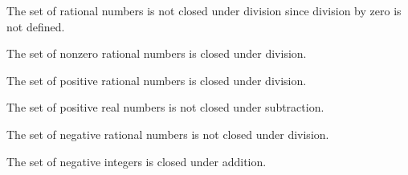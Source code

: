 \begin{list}{}
\item \begin{list}{\bf{(b)}}
\item The set of rational numbers is not closed under division since division by zero is not defined.
\end{list}
\end{list}

\begin{list}{}
\item \begin{list}{\bf{(c)}}
\item The set of nonzero rational numbers is closed under division.
\end{list}
\end{list}

\begin{list}{}
\item \begin{list}{\bf{(d)}}
\item The set of positive rational numbers is closed under division.
\end{list}
\end{list}

\begin{list}{}
\item \begin{list}{\bf{(e)}}
\item The set of positive real numbers is not closed under subtraction.
\end{list}
\end{list}


\begin{list}{}
\item \begin{list}{\bf{(f)}}
\item The set of negative rational numbers is not closed under division.
\end{list}
\end{list}

\begin{list}{}
\item \begin{list}{\bf{(g)}}
\item The set of negative integers is closed under addition.
\end{list}
\end{list}

\hbreak

